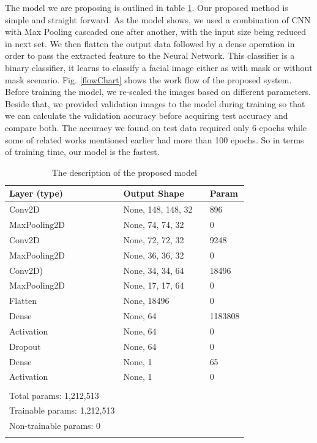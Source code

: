 \documentclass{svproc}
\begin{document}
The model we are proposing is outlined in table \ref{modelTable}. Our proposed method is simple and straight forward. As the model shows, we used a combination of CNN with Max Pooling cascaded one after another, with the input size being reduced in next set. We then flatten the output data followed by a dense operation in order to pass the extracted feature to the Neural Network. This classifier is a binary classifier, it learns to classify a facial image either as with mask or without mask scenario. Fig. \ref{flowChart} shows the work flow of the proposed system. Before training the model, we re-scaled the images based on different parameters. Beside that, we provided validation images to the model during training so that we can calculate the validation accuracy before acquiring test accuracy and compare both. The accuracy we found on test data required only $6$ epochs while some of related works mentioned earlier had more than 100 epochs. So in terms of training time, our model is the fastest.

\begin{table}[!ht]
\centering
\begin{tabular}{llll}
\hline
Layer (type) &  Output Shape & &  Param \\
\hline
Conv2D & None, 148, 148, 32 & & 896 \\
MaxPooling2D & None, 74, 74, 32 & & 0 \\
Conv2D & None, 72, 72, 32 && 9248 \\
MaxPooling2D & None, 36, 36, 32 & & 0 \\
Conv2D) & None, 34, 34, 64 & & 18496 \\
MaxPooling2D & None, 17, 17, 64 & & 0 \\
Flatten & None, 18496 & & 0 \\
Dense & None, 64 & & 1183808 \\
Activation & None, 64 & & 0 \\
Dropout & None, 64 & &  0 \\ 
Dense & None, 1 & &  65 \\
Activation & None, 1 & &  0 \\
\hline \\
Total params: 1,212,513 \\
Trainable params: 1,212,513 \\
Non-trainable params: 0 \\
\hline \\
\end{tabular}
\caption{The description of the proposed model}
\label{modelTable}
\vspace{-6mm}
\end{table}
\end{document}
